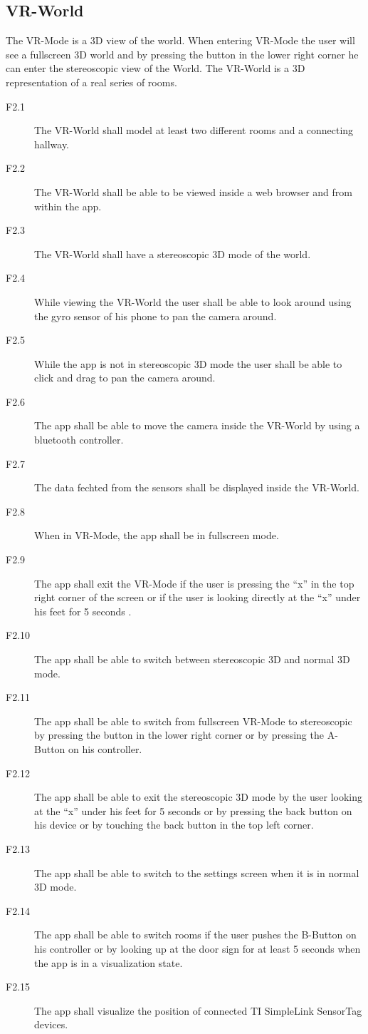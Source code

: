 \subsection{VR-World}
  The VR-Mode is a 3D view of the world. When entering VR-Mode the user will see a fullscreen 3D world and by pressing the button in the lower right corner he can enter the  stereoscopic view of the World.
  The VR-World is a 3D representation of a real series of rooms.
  \begin{description}
    \item[F2.1] The VR-World shall model at least two different rooms and a connecting hallway.
    \item[F2.2] The VR-World shall be able to be viewed inside a web browser and from within the app.
    \item[F2.3] The VR-World shall have a stereoscopic 3D mode of the world.
    \item[F2.4] While viewing the VR-World the user shall be able to look around using the gyro sensor of his phone to pan the camera around.
    \item[F2.5] While the app is not in stereoscopic 3D mode the user shall be able to click and drag to pan the camera around.
    \item[F2.6] The app shall be able to move the camera inside the VR-World by using a bluetooth controller.
    \item[F2.7] The data fechted from the sensors shall be displayed inside the VR-World.
    \item[F2.8] When in VR-Mode, the app shall be in fullscreen mode.
    \item[F2.9] The app shall exit the VR-Mode if the user is pressing the ``x'' in the top right corner of the screen or if the user is looking directly at the ``x'' under his feet for 5 seconds .
    \item[F2.10] The app shall be able to switch between stereoscopic 3D and normal 3D mode.
    \item[F2.11] The app shall be able to switch from fullscreen VR-Mode to stereoscopic by pressing the button in the lower right corner or by pressing the A-Button on his controller.
    \item[F2.12] The app shall be able to exit the stereoscopic 3D mode by the user looking at the ``x'' under his feet for 5 seconds or by pressing the back button on his device or by touching the back button in the top left corner.
    \item[F2.13] The app shall be able to switch to the settings screen when it is in normal 3D mode.
    \item[F2.14] The app shall be able to switch rooms if the user pushes the B-Button on his controller or by looking up at the door sign for at least 5 seconds when the app is in a visualization state.
    \item[F2.15] The app shall visualize the position of connected TI SimpleLink SensorTag devices.
  \end{description}


